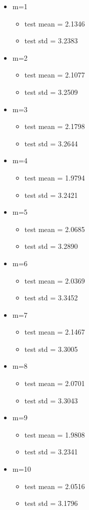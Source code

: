 \documentclass[a4paper]{article}
\begin{document}
\begin{itemize}
    \item m=1
    \begin{itemize}
        \item test mean = 2.1346
        \item test std = 3.2383
    \end{itemize}
    \item m=2
    \begin{itemize}
        \item test mean = 2.1077
        \item test std = 3.2509
    \end{itemize}
    \item m=3
    \begin{itemize}
        \item test mean = 2.1798
        \item test std = 3.2644
    \end{itemize}
    \item m=4
    \begin{itemize}
        \item test mean = 1.9794
        \item test std = 3.2421
    \end{itemize}
    \item m=5
    \begin{itemize}
        \item test mean = 2.0685
        \item test std = 3.2890
    \end{itemize}
    \item m=6
    \begin{itemize}
        \item test mean = 2.0369
        \item test std = 3.3452
    \end{itemize}
    \item m=7
    \begin{itemize}
        \item test mean = 2.1467
        \item test std = 3.3005
    \end{itemize}
    \item m=8
    \begin{itemize}
        \item test mean = 2.0701
        \item test std = 3.3043
    \end{itemize}
    \item m=9
    \begin{itemize}
        \item test mean = 1.9808
        \item test std = 3.2341
    \end{itemize}
    \item m=10
    \begin{itemize}
        \item test mean = 2.0516
        \item test std = 3.1796
    \end{itemize}
\end{itemize}
\end{document}
